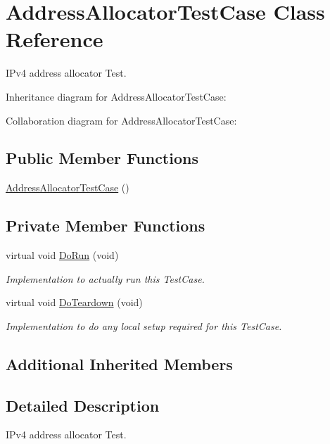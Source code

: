 \hypertarget{classAddressAllocatorTestCase}{}\section{Address\+Allocator\+Test\+Case Class Reference}
\label{classAddressAllocatorTestCase}


I\+Pv4 address allocator Test.  




Inheritance diagram for Address\+Allocator\+Test\+Case\+:


Collaboration diagram for Address\+Allocator\+Test\+Case\+:
\subsection*{Public Member Functions}
\begin{DoxyCompactItemize}
\item 
\hyperlink{classAddressAllocatorTestCase_a3606b5455f13a6b1911dc9345f7e107a}{Address\+Allocator\+Test\+Case} ()
\end{DoxyCompactItemize}
\subsection*{Private Member Functions}
\begin{DoxyCompactItemize}
\item 
virtual void \hyperlink{classAddressAllocatorTestCase_a26db99ba2195a30e4ea34442a778eecd}{Do\+Run} (void)
\begin{DoxyCompactList}\small\item\em Implementation to actually run this Test\+Case. \end{DoxyCompactList}\item 
virtual void \hyperlink{classAddressAllocatorTestCase_a32e2fc8298c4b9f42c437833ee325588}{Do\+Teardown} (void)
\begin{DoxyCompactList}\small\item\em Implementation to do any local setup required for this Test\+Case. \end{DoxyCompactList}\end{DoxyCompactItemize}
\subsection*{Additional Inherited Members}


\subsection{Detailed Description}
I\+Pv4 address allocator Test. 

